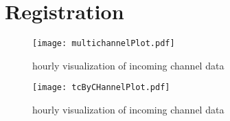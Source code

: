 \documentclass[12pt]{article} \usepackage{graphicx}
\begin{document}
\maketitle




\section{Registration}
\begin{figure}[H]
\centering
  \texttt{[image: multichannelPlot.pdf]}
\caption{hourly visualization of incoming channel data}
\end{figure}

\begin{figure}[H]
\centering
  \texttt{[image: tcByCHannelPlot.pdf]}
\caption{hourly visualization of incoming channel data}
\end{figure}
\end{document}
